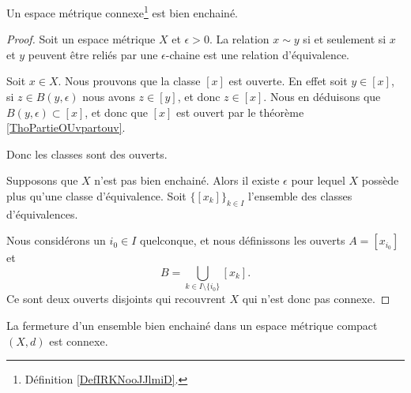 \begin{proposition}       \label{PROPooBUNOooIvfugn}
    Un espace métrique connexe\footnote{Définition \ref{DefIRKNooJJlmiD}.} est bien enchainé.
\end{proposition}

\begin{proof}
    Soit un espace métrique \( X\) et \( \epsilon>0\). La relation \( x\sim y\) si et seulement si \( x\) et \( y\) peuvent être reliés par une \( \epsilon\)-chaine est une relation d'équivalence.

    Soit \( x\in X\). Nous prouvons que la classe \( [x]\) est ouverte. En effet soit \( y\in [x]\), si \( z\in B(y,\epsilon)\) nous avons \( z\in [y]\), et donc \( z\in [x]\). Nous en déduisons que \( B(y,\epsilon)\subset [x]\), et donc que \( [x]\) est ouvert par le théorème \ref{ThoPartieOUvpartouv}.

    Donc les classes sont des ouverts.

    Supposons que \( X\) n'est pas bien enchainé. Alors il existe \( \epsilon\) pour lequel \( X\) possède plus qu'une classe d'équivalence. Soit \( \{ [x_k] \}_{k\in I}\) l'ensemble des classes d'équivalences.

    Nous considérons un \( i_0\in I\) quelconque, et nous définissons les ouverts \( A=[x_{i_0}]\) et
    \begin{equation}
        B=\bigcup_{k\in I\setminus\{ i_0 \}}[x_k].
    \end{equation}
    Ce sont deux ouverts disjoints qui recouvrent \( X\) qui n'est donc pas connexe.
\end{proof}

\begin{proposition}     \label{PROPooXHTWooZibddZ}
    La fermeture d'un ensemble bien enchainé dans un espace métrique compact \( (X,d)\) est connexe.
\end{proposition}

